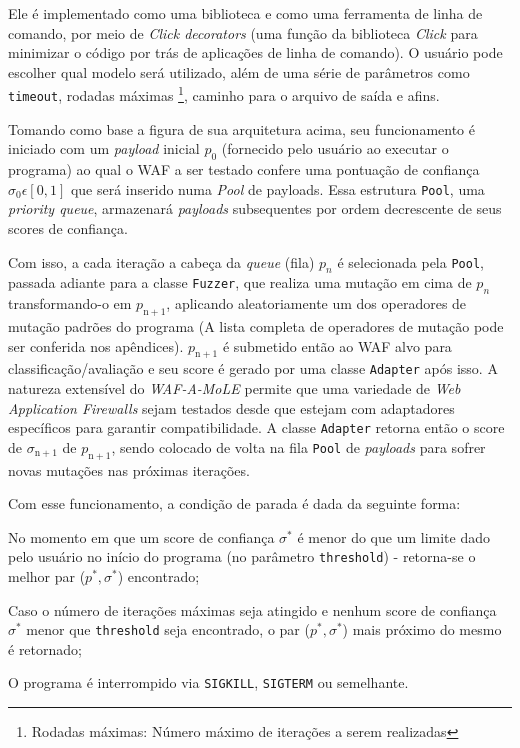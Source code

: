 Ele é implementado como uma biblioteca e como uma ferramenta de linha de comando, por meio de \textit{Click decorators} (uma função da biblioteca \textit{Click} para minimizar o código por trás de aplicações de linha de comando). O usuário pode escolher qual modelo será utilizado, além de uma série de parâmetros como \verb+timeout+, rodadas máximas \footnote{Rodadas máximas: Número máximo de iterações a serem realizadas}, caminho para o arquivo de saída e afins.

Tomando como base a figura de sua arquitetura acima, seu funcionamento é iniciado com um \textit{payload} inicial $p_0$ (fornecido pelo usuário ao executar o programa) ao qual o WAF a ser testado confere uma pontuação de confiança $\sigma_0 \epsilon [0, 1]$ que será inserido numa \textit{Pool} de payloads. Essa estrutura \verb+Pool+, uma \textit{priority queue}, armazenará \textit{payloads} subsequentes por ordem decrescente de seus scores de confiança.

Com isso, a cada iteração a cabeça da \textit{queue} (fila) $p_n$ é selecionada pela \verb+Pool+, passada adiante para a classe \verb+Fuzzer+, que realiza uma mutação em cima de $p_n$ transformando-o em $p_{\mathrm{n+1}}$, aplicando aleatoriamente um dos operadores de mutação padrões do programa (A lista completa de operadores de mutação pode ser conferida nos apêndices). $p_{\mathrm{n+1}}$ é submetido então ao WAF alvo para classificação/avaliação e seu score é gerado por uma classe \verb+Adapter+ após isso. A natureza extensível do \textit{WAF-A-MoLE} permite que uma variedade de \textit{Web Application Firewalls} sejam testados desde que estejam com adaptadores específicos para garantir compatibilidade. A classe \verb+Adapter+ retorna então o score de $\sigma_{\mathrm{n+1}}$ de $p_{\mathrm{n+1}}$, sendo colocado de volta na fila \verb+Pool+ de \textit{payloads} para sofrer novas mutações nas próximas iterações.

\bigskip 

Com esse funcionamento, a condição de parada é dada da seguinte forma:
\begin{alineas}
\item No momento em que um score de confiança $\sigma^*$ é menor do que um limite dado pelo usuário no início do programa (no parâmetro \verb+threshold+) - retorna-se o melhor par ($p^*, \sigma^*$) encontrado;
\item Caso o número de iterações máximas seja atingido e nenhum score de confiança $\sigma^*$ menor que \verb+threshold+ seja encontrado, o par ($p^*, \sigma^*$) mais próximo do mesmo é retornado;
\item O programa é interrompido via \verb+SIGKILL+, \verb+SIGTERM+ ou semelhante.
\end{alineas}

